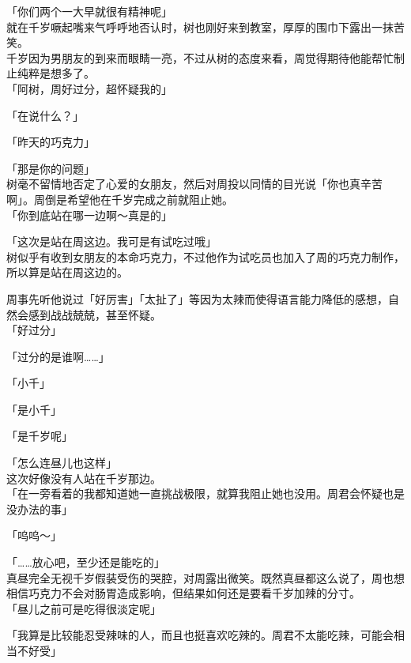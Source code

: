 「你们两个一大早就很有精神呢」\\

就在千岁噘起嘴来气呼呼地否认时，树也刚好来到教室，厚厚的围巾下露出一抹苦笑。\\

千岁因为男朋友的到来而眼睛一亮，不过从树的态度来看，周觉得期待他能帮忙制止纯粹是想多了。\\

「阿树，周好过分，超怀疑我的」

「在说什么？」

「昨天的巧克力」

「那是你的问题」\\

树毫不留情地否定了心爱的女朋友，然后对周投以同情的目光说「你也真辛苦啊」。周倒是希望他在千岁完成之前就阻止她。\\

「你到底站在哪一边啊～真是的」

「这次是站在周这边。我可是有试吃过哦」\\

树似乎有收到女朋友的本命巧克力，不过他作为试吃员也加入了周的巧克力制作，所以算是站在周这边的。

周事先听他说过「好厉害」「太扯了」等因为太辣而使得语言能力降低的感想，自然会感到战战兢兢，甚至怀疑。\\

「好过分」

「过分的是谁啊……」

「小千」

「是小千」

「是千岁呢」

「怎么连昼儿也这样」\\

这次好像没有人站在千岁那边。\\

「在一旁看着的我都知道她一直挑战极限，就算我阻止她也没用。周君会怀疑也是没办法的事」

「呜呜～」

「……放心吧，至少还是能吃的」\\

真昼完全无视千岁假装受伤的哭腔，对周露出微笑。既然真昼都这么说了，周也想相信巧克力不会对肠胃造成影响，但结果如何还是要看千岁加辣的分寸。\\

「昼儿之前可是吃得很淡定呢」

「我算是比较能忍受辣味的人，而且也挺喜欢吃辣的。周君不太能吃辣，可能会相当不好受」

